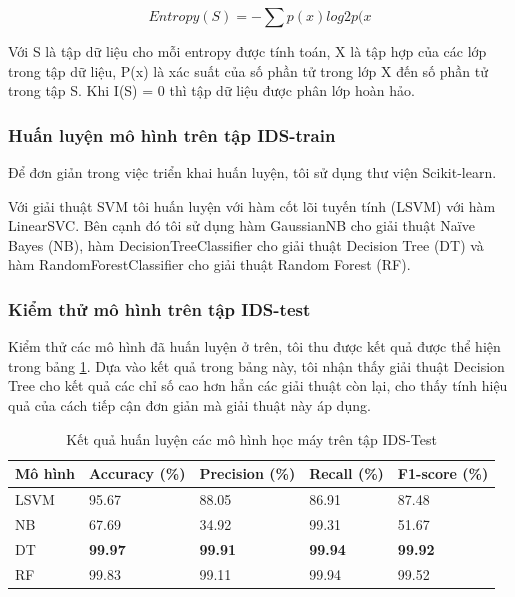 \[Entropy(S) = -\sum p(x)log2p(x\]

Với S là tập dữ liệu cho mỗi entropy được tính toán, X là tập hợp của các lớp trong tập dữ liệu, P(x) là xác suất của số phần tử trong lớp X đến số phần tử trong tập S. Khi I(S) = 0 thì tập dữ liệu được phân lớp hoàn hảo.

\subsubsection{Huấn luyện mô hình trên tập IDS-train}

Để đơn giản trong việc triển khai huấn luyện, tôi sử dụng thư viện Scikit-learn.

Với giải thuật SVM tôi huấn luyện với hàm cốt lõi tuyến tính (LSVM) với hàm LinearSVC. Bên cạnh đó tôi sử dụng hàm GaussianNB cho giải thuật Naïve Bayes (NB), hàm DecisionTreeClassifier cho giải thuật  Decision Tree (DT) và hàm RandomForestClassifier cho giải thuật Random Forest (RF).

\subsubsection{Kiểm thử mô hình trên tập IDS-test}

Kiểm thử  các mô hình đã huấn luyện ở trên, tôi thu được kết quả được thể hiện trong bảng \ref{tab:machine-learning-models-result}. Dựa vào kết quả trong bảng này, tôi nhận thấy giải thuật Decision Tree cho kết quả các chỉ số cao hơn hẳn các giải thuật còn lại, cho thấy tính hiệu quả của cách tiếp cận đơn giản mà giải thuật này áp dụng.

\begin{table}[ht!]
	\centering
	\begin{tabular}{|l|l|l|l|l|}
		\hline
		\multicolumn{1}{|c|}{\textbf{Mô hình}} &
		\multicolumn{1}{c|}{\textbf{Accuracy (\%)}} &
		\multicolumn{1}{c|}{\textbf{Precision (\%)}} &
		\multicolumn{1}{c|}{\textbf{Recall (\%)}} &
		\multicolumn{1}{c|}{\textbf{F1-score (\%)}} \\ \hline
		LSVM    & 95.67 & 88.05 & 86.91 & 87.48 \\ \hline
		NB      & 67.69 & 34.92 & 99.31 & 51.67 \\ \hline
		DT      & \textbf{99.97} & \textbf{99.91} & \textbf{99.94} & \textbf{99.92} \\ \hline
		RF      & 99.83 & 99.11 & 99.94 & 99.52 \\ \hline
	\end{tabular}
	\caption{Kết quả huấn luyện các mô hình học máy trên tập IDS-Test}
	\label{tab:machine-learning-models-result}
\end{table}

